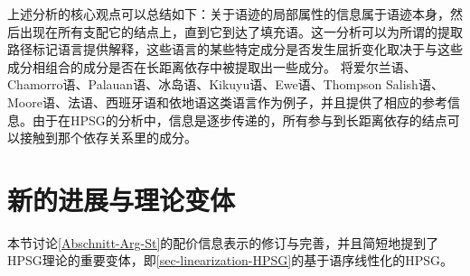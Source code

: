 上述分析的核心观点可以总结如下：关于语迹的局部属性的信息属于语迹本身，然后出现在所有支配它的结点上，直到它到达了填充语。这一分析可以为所谓的提取路径标记语言提供解释，这些语言的某些特定成分是否发生屈折变化取决于与这些成分相组合的成分是否在长距离依存中被提取出一些成分。 \citet*{BMS2001a}将\label{page-Irish-complementizers}爱尔兰语、Chamorro语、Palauan语、冰岛语、Kikuyu语、Ewe语、Thompson Salish语、Moore语、法语、西班牙语和依地语这类语言作为例子，并且提供了相应的参考信息。由于在HPSG的分析中，信息是逐步传递的，所有参与到长距离依存的结点可以接触到那个依存关系里的成分。

\section{新的进展与理论变体}

本节讨论\ref{Abschnitt-Arg-St}的配价信息表示的修订与完善，并且简短地提到了HPSG理论的重要变体，即\ref{sec-linearization-HPSG}的基于语序线性化的HPSG。

